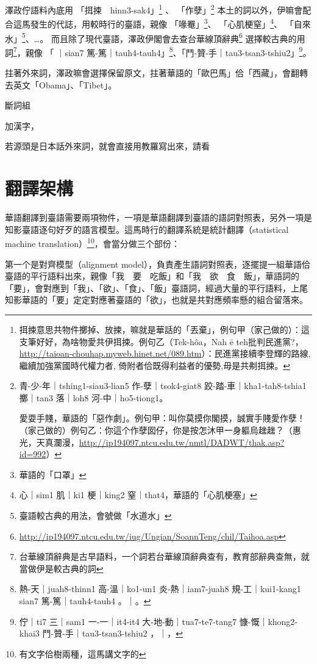 \documentclass[final,oneside,onecolumn,12pt,a4paper]{book}%
\begin{document}
澤政佇語料內底用
「挕捒　hinn3-sak4」\footnote{挕捒意思共物件擲掉、放捒，嘛就是華話的「丟棄」，例句甲（家己做的）：這支筆好好，為啥物愛共伊挕捒。例句乙（Tek-hôa，Nah ē teh批判民進黨?，\url{http://taioan-chouhap.myweb.hinet.net/089.htm}）：民進黨接續李登輝的路線, 繼續加強黨國時代權力者, 倚附者佮既得利益者的優勢,毋是共刜挕捒。}
、
「作孽」\footnote{
青-少-年｜tshing1-siau3-lian5 作-孽｜tsok4-giat8 跤-踏-車｜kha1-tah8-tshia1 擲｜tan3 落｜loh8 河-中｜ho5-tiong1。

愛耍手賤，華語的「惡作劇」。例句甲：叫你莫摸你閣摸，誠實手賤愛作孽！（家己做的）例句乙：你這个作孽囡仔，你是按怎沐甲一身軀烏趖趖？（惠光，天真瀾漫，\url{http://ip194097.ntcu.edu.tw/nmtl/DADWT/thak.asp?id=992}）}
本土的詞以外，伊嘛會配合這馬發生的代誌，用較時行的臺語，親像
「喙罨」\footnote{華語的「口罩」}、
「心肌梗窒」\footnote{心｜sim1 肌｜ki1 梗｜king2 窒｜that4，華語的「心肌梗塞」}、
「自來水」\footnote{臺語較古典的用法，會號做「水道水」}、…。
而且除了現代臺語，澤政伊閣會去查台華線頂辭典\footnote{\url{http://ip194097.ntcu.edu.tw/iug/Ungian/SoannTeng/chil/Taihoa.asp}}
選擇較古典的用詞\footnote{台華線頂辭典是古早語料，一个詞若台華線頂辭典查有，教育部辭典查無，就當做伊是較古典的詞}，親像
「𤺪｜sian7 篤-篤｜tauh4-tauh4」\footnote{熱-天｜juah8-thinn1 高-溫｜ko1-un1 炎-熱｜iam7-juah8 規-工｜kui1-kang1 𤺪｜sian7 篤-篤｜tauh4-tauh4 。｜。}、「鬥-贊-手｜tau3-tsan3-tshiu2」\footnote{佇｜ti7 三｜sam1 一-一｜it4-it4 大-地-動｜tua7-te7-tang7 慷-慨｜khong2-khai3 鬥-贊-手｜tau3-tsan3-tshiu2 ，｜，}。

拄著外來詞，澤政嘛會選擇保留原文，拄著華語的「歐巴馬」佮「西藏」，會翻轉去英文「Obama」、「Tibet」。

斷詞組

加漢字，

若源頭是日本話外來詞，就會直接用教羅寫出來，請看

\section{翻譯架構}
\label{節：翻譯架構}
華語翻譯到臺語需要兩項物件，一項是華語翻譯到臺語的語詞對照表，另外一項是知影臺語逐句好歹的語言模型。這馬時行的翻譯系統是統計翻譯（statistical machine translation）\footnote{有文字佮樹兩種，這馬講文字的}，會當分做三个部份：

第一个是對齊模型（alignment model），負責產生語詞對照表，逐擺提一組華語佮臺語的平行語料出來，親像「我　要　吃飯」和「我　欲　食　飯」，華語詞的「要」，會對應到「我」、「欲」、「食」、「飯」臺語詞，經過大量的平行語料，上尾知影華語的「要」定定對應著臺語的「欲」，也就是共對應頻率懸的組合留落來。
\end{document}
